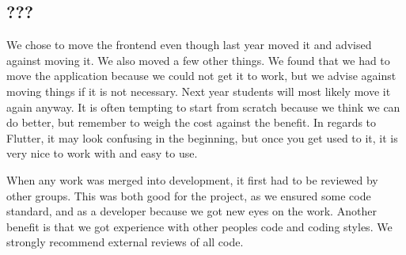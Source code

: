 \subsection{???}
We chose to move the frontend even though last year moved it and advised against moving it. We also moved a few other things. We found that we had to move the application because we could not get it to work, but we advise against moving things if it is not necessary. Next year students will most likely move it again anyway. It is often tempting to start from scratch because we think we can do better, but remember to weigh the cost against the benefit. In regards to Flutter, it may look confusing in the beginning, but once you get used to it, it is very nice to work with and easy to use.

When any work was merged into development, it first had to be reviewed by other groups. This was both good for the project, as we ensured some code standard, and as a developer because we got new eyes on the work. Another benefit is that we got experience with other peoples code and coding styles. We strongly recommend external reviews of all code.
